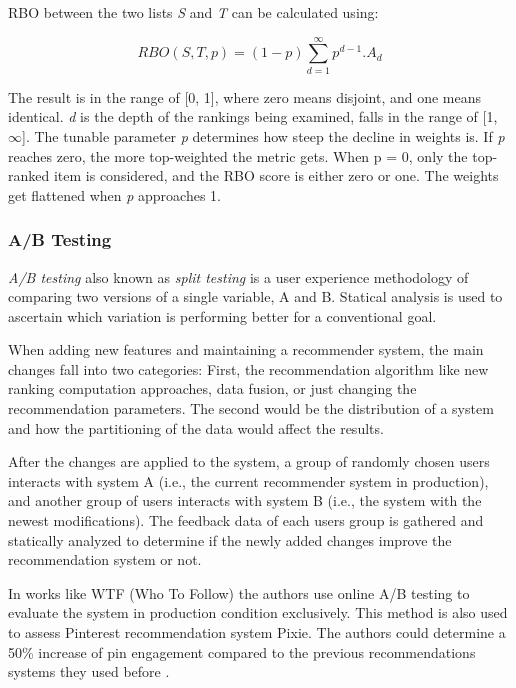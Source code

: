 RBO between the two lists \emph{S} and \emph{T} can be calculated using:

\begin{equation}
    RBO(S,T,p) = (1-p)\sum_{d=1}^{\infty}p^{d-1}.A_{d}
    \label{eq:rbo}
\end{equation}


The result is in the range of [0, 1], where zero means disjoint, and one means identical. \emph{d} is the depth of the rankings being examined, falls in the range of [1, $\infty$]. The tunable parameter \emph{p} determines how steep the decline in weights is. If \emph{p} reaches zero, the more top-weighted the metric gets. When p = 0, only the top-ranked item is considered, and the RBO score is either zero or one. The weights get flattened when \emph{p} approaches 1.


\subsubsection{A/B Testing}
\label{subsubsec:ab-testing}
\emph{A/B testing} also known as \emph{split testing} is a user experience methodology of comparing two versions of a single variable, A and B. Statical analysis is used to ascertain which variation is performing better for a conventional goal.

When adding new features and maintaining a recommender system, the main changes fall into two categories: First, the recommendation algorithm like new ranking computation approaches, data fusion, or just changing the recommendation parameters. The second would be the distribution of a system and how the partitioning of the data would affect the results. 


After the changes are applied to the system, a group of randomly chosen users interacts with system A (i.e., the current recommender system in production), and another group of users interacts with system B (i.e., the system with the newest modifications). The feedback data of each users group is gathered and statically analyzed to determine if the newly added changes improve the recommendation system or not.

In works like WTF (Who To Follow) \cite{guptaWTFWhoFollow2013} the authors use online A/B testing to evaluate the system in production condition exclusively. This method is also used to assess Pinterest recommendation system Pixie. The authors could determine a 50\% increase of pin engagement compared to the previous recommendations systems they used before \cite{eksombatchaiPixieSystemRecommending2018}.


